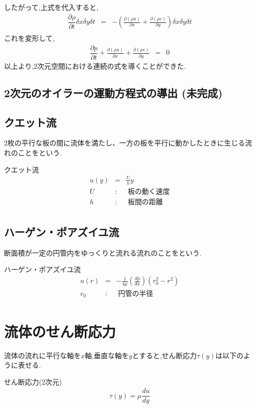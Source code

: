 \documentclass[a4paper]{jsarticle}
\begin{document}
したがって,上式を代入すると,
\begin{eqnarray*}
    \dfrac{\partial \rho}{\partial t}\delta x \delta y \delta t&=&-\left(\frac{\partial\left(\rho u\right)}{\partial x}+\frac{\partial\left(\rho v\right)}{\partial y}\right)\delta x \delta y \delta t\\
\end{eqnarray*}
これを変形して,
\begin{eqnarray*}
    \dfrac{\partial p}{\partial t}+\frac{\partial\left(\rho u\right)}{\partial x}+\frac{\partial\left(\rho v\right)}{\partial y}&=&0
\end{eqnarray*}
以上より,2次元空間における連続の式を導くことができた.
\subsection{2次元のオイラーの運動方程式の導出 (未完成)}
\subsection{クエット流}
2枚の平行な板の間に流体を満たし、一方の板を平行に動かしたときに生じる流れのことをという.
\begin{itembox}[l]{クエット流}
    \begin{eqnarray*}
        u\left(y\right)&=&\frac{U}{h}y\\
        U \;&:&\; 板の動く速度\\
        h \;&:&\; 板間の距離\\
    \end{eqnarray*}
\end{itembox}
\subsection{ハーゲン・ポアズイユ流}
断面積が一定の円管内をゆっくりと流れる流れのことをという.
\begin{itembox}[l]{ハーゲン・ポアズイユ流}
    \begin{eqnarray*}
        u\left(r\right)&=&-\frac{1}{4\mu}\left(\frac{dp}{dx}\right)\left(r_0^2-r^2\right)\\
        r_0\; &:&\; 円管の半径\\
    \end{eqnarray*}
\end{itembox}
\section{流体のせん断応力}
流体の流れに平行な軸を$x$軸,垂直な軸を$y$とすると,せん断応力$\tau\left(y\right)$は以下のように表せる.
\begin{itembox}[l]{せん断応力(2次元)}
    \begin{eqnarray*}
        \tau\left(y\right)=\mu\dfrac{du}{dy}\\
    \end{eqnarray*}
\end{itembox}
\end{document}
